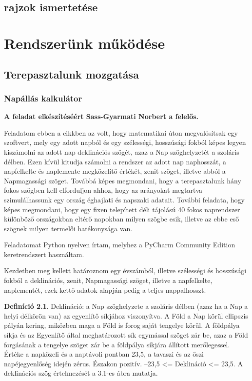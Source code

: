 \documentclass[
]{thesis-ekf}
\theoremstyle{definition}
\newtheorem{definicio}[tetel]{Definíció}
\theoremstyle{remark}
\begin{document}
	\section{rajzok ismertetése}

\chapter{Rendszerünk működése}
	\section{Terepasztalunk mozgatása}
		\subsection{Napállás kalkulátor}
			\textbf{A feladat elkészítéséért Sass-Gyarmati Norbert a felelős.} 
			\par Feladatom ebben a cikkben az volt, hogy matematikai úton megvalósítsak egy szoftvert, mely egy adott napból és egy szélességi, hosszúsági fokból képes legyen kiszámolni az adott nap deklinációs szögét, azaz a Nap szöghelyzetét a szoláris délben. Ezen kívül kitudja számolni a rendszer az adott nap naphosszát, a napfelkelte és naplemente megközelítő értékét, zenit szöget, illetve abból a Napmagassági szöget. Továbbá képes megmondani, hogy a terepasztalunk hány fokos szögben kell elforduljon ahhoz, hogy az arányokat megtartva szimulálhassunk egy ország éghajlati és napszaki adatait. További feladata, hogy képes megmondani, hogy egy fixen telepített déli tájolású 40 fokos naprendszer különböző országokban eltérő napokban milyen szögbe esik, illetve az ebbe eső szögnek milyen termelői hatékonysága van.
			\par Feladatomat Python nyelven írtam, melyhez a PyCharm Community Edition keretrendszert használtam. 
			\par Kezdetben meg kellett határoznom egy évszámból, illetve szélességi és hosszúsági fokból a deklinációs, zenit, Napmagassági szöget, illetve a napfelkelte, naplementét, ezek kettő adatok alapján pedig a teljes nappalhosszt. 
			
			\begin{definicio}
				Deklináció: a Nap szöghelyzete a szoláris délben (azaz ha a Nap a helyi délkörön van) az egyenlítő síkjához viszonyítva. A Föld a Nap körül ellipszis pályán kering, miközben maga a Föld is forog saját tengelye körül. A földpálya síkja és az Egyenlítő által meghatározott sík egymással szöget zár be, azaz a Föld forgásának a tengelye szöget zár be a földpálya síkjára állított merőlegessel. Értéke a napközeli és a naptávoli pontban 23,5, a tavaszi és az őszi napéjegyenlőség idején zérus. Északon pozitív. –23,5 <=  Deklináció <= 23,5. A deklinációs szög értelmezését a 3.1-es ábra mutatja.
			
				\cite{Kornyezet}
			\end{definicio}
\end{document}
